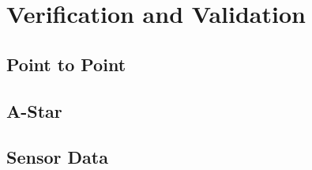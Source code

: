 \section{Verification and Validation}

\subsection{Point to Point}

\subsection{A-Star}

\subsection{Sensor Data}